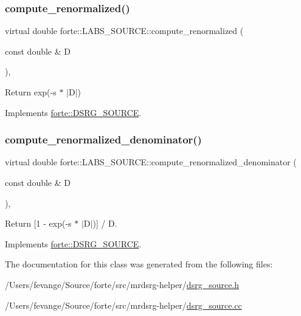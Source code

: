 \subsubsection{\texorpdfstring{compute\+\_\+renormalized()}{compute\_renormalized()}}
{\footnotesize\ttfamily virtual double forte\+::\+L\+A\+B\+S\+\_\+\+S\+O\+U\+R\+C\+E\+::compute\+\_\+renormalized (\begin{DoxyParamCaption}\item[{const double \&}]{D }\end{DoxyParamCaption})\hspace{0.3cm}{\ttfamily [inline]}, {\ttfamily [virtual]}}



Return exp(-\/s $\ast$ $\vert$\+D$\vert$) 



Implements \mbox{\hyperlink{classforte_1_1_d_s_r_g___s_o_u_r_c_e_a8b4c4428bb50af4561c256e3180f6b31}{forte\+::\+D\+S\+R\+G\+\_\+\+S\+O\+U\+R\+CE}}.

\mbox{\label{classforte_1_1_l_a_b_s___s_o_u_r_c_e_a2bb2384aa4d711db4c3116e466d56835}} 
\subsubsection{\texorpdfstring{compute\+\_\+renormalized\+\_\+denominator()}{compute\_renormalized\_denominator()}}
{\footnotesize\ttfamily virtual double forte\+::\+L\+A\+B\+S\+\_\+\+S\+O\+U\+R\+C\+E\+::compute\+\_\+renormalized\+\_\+denominator (\begin{DoxyParamCaption}\item[{const double \&}]{D }\end{DoxyParamCaption})\hspace{0.3cm}{\ttfamily [inline]}, {\ttfamily [virtual]}}



Return \mbox{[}1 -\/ exp(-\/s $\ast$ $\vert$\+D$\vert$)\mbox{]} / D. 



Implements \mbox{\hyperlink{classforte_1_1_d_s_r_g___s_o_u_r_c_e_a7345ba63c3612369be7c4cc896b7d5c4}{forte\+::\+D\+S\+R\+G\+\_\+\+S\+O\+U\+R\+CE}}.



The documentation for this class was generated from the following files\+:\begin{DoxyCompactItemize}
\item 
/\+Users/fevange/\+Source/forte/src/mrdsrg-\/helper/\mbox{\hyperlink{dsrg__source_8h}{dsrg\+\_\+source.\+h}}\item 
/\+Users/fevange/\+Source/forte/src/mrdsrg-\/helper/\mbox{\hyperlink{dsrg__source_8cc}{dsrg\+\_\+source.\+cc}}\end{DoxyCompactItemize}
